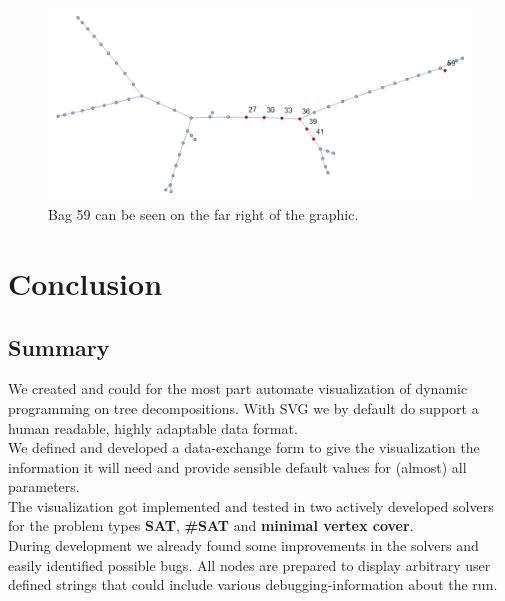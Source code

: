 \documentclass[a4paper, 12pt, bibliography=totoc]{scrartcl}
\begin{document}
\begin{figure}
	\centering
	\includegraphics[width=0.9\linewidth,height=0.9\textheight,keepaspectratio]{images/stars100var100.png}
	\caption{Bag 59 can be seen on the far right of the graphic.}
	\label{fig:bag59td}
\end{figure}
\newpage
\section{Conclusion}\label{sec:conclusion}
\subsection{Summary}
We created and could for the most part automate visualization of dynamic programming on tree decompositions.
With SVG we by default do support a human readable, highly adaptable data format.\\

We defined and developed a data-exchange form to give the visualization the information it will need and provide sensible default values for (almost) all parameters.\\

The visualization got implemented and tested in two actively developed solvers for the problem types \textbf{SAT}, \textbf{\#SAT} and \textbf{minimal vertex cover}.\\

During development we already found some improvements in the solvers and easily identified possible bugs.
All nodes are prepared to display arbitrary user defined strings that could include various debugging-information about the run.
\end{document}
